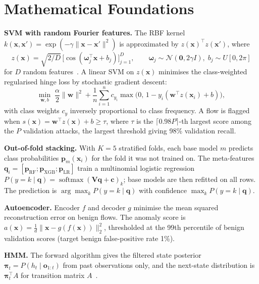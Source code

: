 \documentclass[12pt,a4paper,oneside]{report}
\begin{document}
\section{Mathematical Foundations}
\textbf{SVM with random Fourier features.} The RBF kernel $k(\mathbf{x},\mathbf{x}')=\exp(-\gamma\lVert\mathbf{x}-\mathbf{x}'\rVert^2)$ is approximated by $z(\mathbf{x})^\top z(\mathbf{x}')$, where
\begin{equation}
z(\mathbf{x})=\sqrt{2/D}\,\big[\cos(\boldsymbol{\omega}_j^\top\mathbf{x}+b_j)\big]_{j=1}^{D},\qquad \boldsymbol{\omega}_j\sim\mathcal{N}(\mathbf{0},2\gamma I),\; b_j\sim U[0,2\pi]
\end{equation}
for $D$ random features~\cite{rahimi2007random}. A linear SVM on $z(\mathbf{x})$ minimises the class-weighted regularised hinge loss by stochastic gradient descent:
\begin{equation}
\min_{\mathbf{w},b}\; \frac{\alpha}{2}\lVert\mathbf{w}\rVert^2+\frac{1}{n}\sum_{i=1}^{n} c_{y_i}\max\big(0,\,1-y_i(\mathbf{w}^\top z(\mathbf{x}_i)+b)\big),
\end{equation}
with class weights $c_y$ inversely proportional to class frequency. A flow is flagged when $s(\mathbf{x})=\mathbf{w}^\top z(\mathbf{x})+b\ge\tau$, where $\tau$ is the $\lceil 0.98P\rceil$-th largest score among the $P$ validation attacks, the largest threshold giving 98\% validation recall.

\textbf{Out-of-fold stacking.} With $K=5$ stratified folds, each base model $m$ predicts class probabilities $\mathbf{p}_m(\mathbf{x}_i)$ for the fold it was not trained on. The meta-features $\mathbf{q}_i=[\mathbf{p}_{\text{RF}};\mathbf{p}_{\text{XGB}};\mathbf{p}_{\text{LR}}]$ train a multinomial logistic regression $P(y=k\mid\mathbf{q})=\operatorname{softmax}(\mathbf{V}\mathbf{q}+\mathbf{c})_k$; base models are then refitted on all rows. The prediction is $\arg\max_k P(y=k\mid\mathbf{q})$ with confidence $\max_k P(y=k\mid\mathbf{q})$.

\textbf{Autoencoder.} Encoder $f$ and decoder $g$ minimise the mean squared reconstruction error on benign flows. The anomaly score is $a(\mathbf{x})=\frac{1}{d}\lVert\mathbf{x}-g(f(\mathbf{x}))\rVert_2^2$, thresholded at the 99th percentile of benign validation scores (target benign false-positive rate 1\%).

\textbf{HMM.} The forward algorithm gives the filtered state posterior $\boldsymbol{\pi}_t=P(h_t\mid\mathbf{o}_{1:t})$ from past observations only, and the next-state distribution is $\boldsymbol{\pi}_t^\top A$ for transition matrix $A$~\cite{rabiner1989tutorial}.
\end{document}
